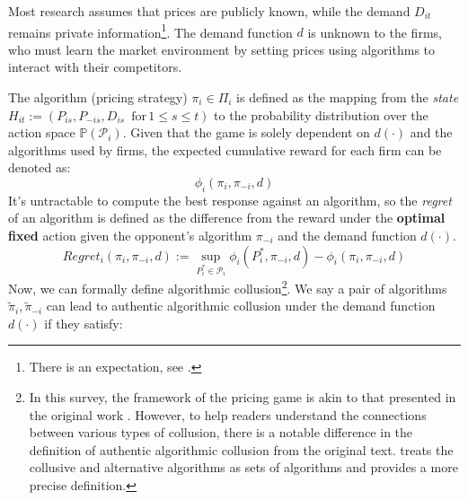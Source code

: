 \documentclass[mnsc,nonblindrev]{workingpaper}
\begin{document}
Most research assumes that prices are publicly known, while the demand $D_{it}$ remains private information\footnote{There is an expectation, see \cite{meylahn2022learning}.}. The demand function $d$ is unknown to the firms, who must learn the market environment by setting prices using algorithms to interact with their competitors. 

The algorithm (pricing strategy) $\pi_i\in \Pi_i$ is defined as the mapping from the \textit{state} $H_{it} := (P_{is}, P_{-is}, D_{is} \, \text{ for} \, 1 \leq s \leq t)$ to the probability distribution over the action space $\mathbb{P}(\mathcal{P}_i)$. Given that the game is solely dependent on $d(\cdot)$ and the algorithms used by firms, the expected cumulative reward for each firm can be denoted as:
\[
\phi_i(\pi_i,\pi_{-i},d)
\]
It's untractable to compute the best response against an algorithm, so the \textit{regret} of an algorithm is defined as the difference from the reward under the \textbf{optimal fixed} action given the opponent's algorithm $\pi_{-i}$ and the demand function $d(\cdot)$.
\[  
Regret_i(\pi_i,\pi_{-i},d):=\sup_{P_i^*\in \mathcal{P}_i} \phi_i(P_i^*,\pi_{-i},d) - \phi_i(\pi_i,\pi_{-i},d)
\]
Now, we can formally define algorithmic collusion\footnote{In this survey, the framework of the pricing game is akin to that presented in the original work \cite{den2023mathematical}. However, to help readers understand the connections between various types of collusion, there is a notable difference in the definition of authentic algorithmic collusion from the original text. \cite{den2023mathematical} treats the collusive and alternative algorithms as sets of algorithms and provides a more precise definition.}. We say a pair of algorithms $\tilde{\pi}_i, \tilde{\pi}_{-i}$ can lead to authentic algorithmic collusion under the demand function $d(\cdot)$ if they satisfy:
\end{document}
